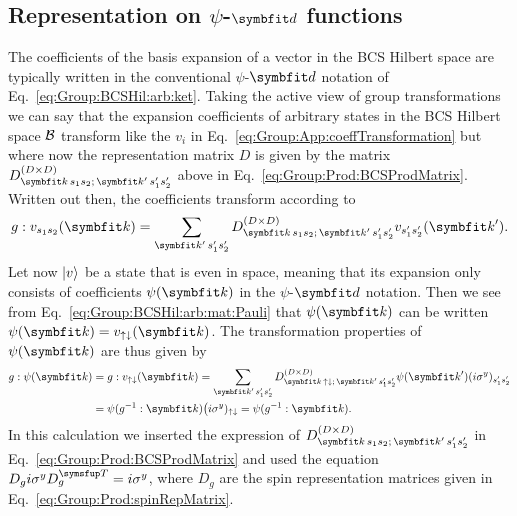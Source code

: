 \subsection{Representation on $\psi$-$\v{d}$ functions}
\label{sec:Group:pdRep}

The coefficients of the basis expansion of a vector in the BCS Hilbert space are typically written in the conventional $\psi$-$\v{d}$ notation of 
Eq.~\eqref{eq:Group:BCSHil:arb:ket}. Taking the active view of group transformations we can say that the expansion coefficients of arbitrary states
in the BCS Hilbert space $\mathcal{B}$ transform like the $v_i$ in Eq.~\eqref{eq:Group:App:coeffTransformation} but where now the representation
matrix $D$ is given by the matrix $D^{(D\times D)}_{\v{k}\,s_1s_2;\,\v{k}'\,s_1's_2'}$ above in Eq.~\eqref{eq:Group:Prod:BCSProdMatrix}. Written
out then, the coefficients transform according to
\begin{equation}
    \label{eq:Group:pdRep:coeffTrans}
    g:v_{s_1s_2}(\v{k}) = \sum_{\v{k}'\,s_1's_2'}D^{(D\times D)}_{\v{k}\,s_1s_2;\,\v{k}'\,s_1's_2'}v_{s_1's_2'}(\v{k}').
\end{equation}
Let now $\lvert v \rangle$ be a state that is even in space, meaning that its expansion only consists of coefficients $\psi(\v{k})$ in the $\psi$-$\v{d}$
notation. Then we see from Eq.~\eqref{eq:Group:BCSHil:arb:mat:Pauli} that $\psi(\v{k})$ can be written $\psi(\v{k}) = v_{\up\dn}(\v{k})$.
The transformation properties of $\psi(\v{k})$ are thus given by
\begin{equation}
    \label{eq:Group:pdRep:psiRep}
    \begin{split}
        g:\psi(\v{k}) &= g:v_{\up\dn}(\v{k}) = \sum_{\v{k}'\,s_1's_2'}D^{(D\times D)}_{\v{k}\,\up\dn;\,\v{k}'\,s_1's_2'}\psi(\v{k}')(i\sigma^y)_{s_1's_2'}\\
        &=\psi(g^{-1}:\v{k})\big(i\sigma^y)_{\up\dn} = \psi(g^{-1}:\v{k}).
    \end{split}
\end{equation}
In this calculation we inserted the expression of $D^{(D\times D)}_{\v{k}\,s_1s_2;\,\v{k}'\,s_1's_2'}$ in Eq.~\eqref{eq:Group:Prod:BCSProdMatrix} and used
the equation $D_gi\sigma^y D_g^\trans = i\sigma^y$, where $D_g$ are the spin representation matrices given in Eq.~\eqref{eq:Group:Prod:spinRepMatrix}.

